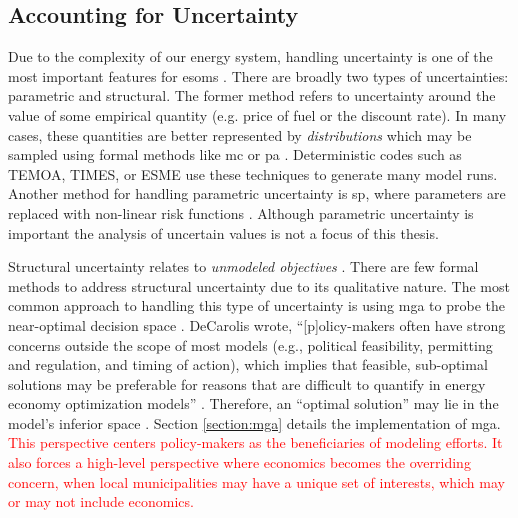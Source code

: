 \subsection{Accounting for Uncertainty}
Due to the complexity of our energy system, handling uncertainty is one of the most 
important features for \acp{esom} \cite{yue_review_2018,
decarolis_using_2011}. There are broadly two types of uncertainties: parametric 
and structural. The former method refers to uncertainty around the value of some 
empirical quantity (e.g. price of fuel or the discount rate). In many cases, these 
quantities are better represented by \textit{distributions} which may be sampled 
using formal methods like \ac{mc} or \ac{pa} \cite{pfenninger_energy_2014, 
yue_review_2018}. Deterministic codes such as TEMOA, TIMES, or ESME use these 
techniques to generate many model runs. Another method for handling parametric 
uncertainty is \ac{sp}, where parameters are replaced with non-linear risk 
functions \cite{yue_review_2018, decarolis_multi-stage_2012}. Although parametric 
uncertainty is important the analysis of uncertain values is not a focus of this 
thesis.

Structural uncertainty relates to \textit{unmodeled objectives} 
\cite{yue_review_2018, decarolis_using_2011, decarolis_modelling_2016}. There are 
few formal methods to address structural uncertainty due to its qualitative 
nature. The most common approach to handling this type of uncertainty is using 
\ac{mga} to probe the near-optimal decision space \cite{brill_mga_1990,
jenkins_genx_2022, decarolis_using_2011, neumann_near-optimal_2021, 
pfenninger_energy_2014}. DeCarolis wrote, ``[p]olicy-makers often have strong 
concerns outside the scope of most models (e.g., political feasibility, permitting 
and regulation, and timing of action), which implies that feasible, sub-optimal 
solutions may be preferable for reasons that are difficult to quantify in energy 
economy optimization models'' \cite{decarolis_using_2011}. Therefore, an ``optimal 
solution'' may lie in the model's inferior space \cite{decarolis_using_2011}. 
Section \ref{section:mga} details the implementation of \ac{mga}.
\textcolor{red}{This perspective centers policy-makers as the beneficiaries of 
modeling efforts. It also forces a high-level perspective where economics becomes 
the overriding concern, when local municipalities may have a unique set of 
interests, which may or may not include economics.}


